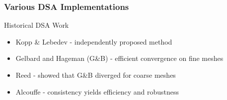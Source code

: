 \documentclass[compress,10pt]{beamer}
\begin{document}
\begin{frame}[t]\frametitle{Various DSA Implementations}
\begin{block}{Historical DSA Work}
\begin{itemize}
	\item Kopp \& Lebedev - independently proposed method
	\item Gelbard and Hageman (G\&B) - efficient convergence on fine meshes
	\item Reed - showed that G\&B diverged for coarse meshes
	\item Alcouffe - consistency yields efficiency and robustness
\end{itemize}
\end{block}
\end{frame}
\end{document}
